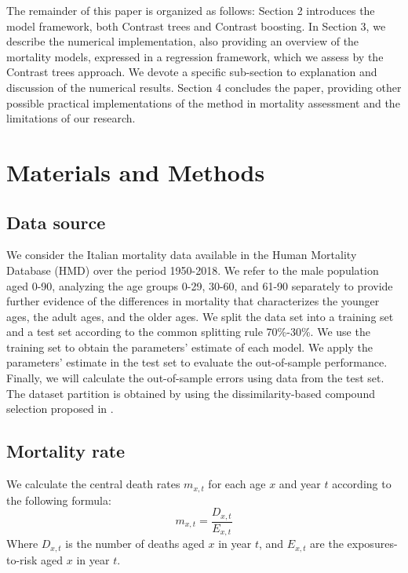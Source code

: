 \documentclass[a4,11pt]{article}
\begin{document}
The remainder of this paper is organized as follows: Section 2 introduces the model framework, both Contrast trees and Contrast boosting. 
In Section 3, we describe the numerical implementation, also providing an overview of the mortality models, expressed in a regression framework, which we assess by the Contrast trees approach. We devote a specific sub-section to explanation and discussion of the numerical results. 
Section 4 concludes the paper, providing other possible practical implementations of the method in mortality assessment and the limitations of our research.

\section{Materials and Methods}

\subsection{Data source}

We consider the Italian mortality data available in the Human Mortality Database (HMD) over the period 1950-2018. We refer to the male population aged 0-90, analyzing the age groups 0-29, 30-60, and 61-90 separately to provide further evidence of the differences in mortality that characterizes the younger ages, the adult ages, and the older ages. 
We split the data set into a training set and a test set according to the common splitting rule 70\%-30\%. 
We use the training set to obtain the parameters' estimate of each model. We apply the parameters' estimate in the test set to evaluate the out-of-sample performance. Finally, we will calculate the out-of-sample errors using data from the test set. The dataset partition is obtained by using the dissimilarity-based compound selection proposed in \cite{Willett1999}.

\subsection*{Mortality rate}
We calculate the central death rates $m_{x,t}$ for each age $x$ and year $t$ according to the following formula:
\begin{equation} 
\label{eq:mxt}
m_{x,t}=\frac{D_{x,t}}{E_{x,t}}
\end{equation}
Where $D_{x,t}$ is the number of deaths aged $x$ in year $t$, and $E_{x,t}$ are the exposures-to-risk aged $x$ in year $t$.
\end{document}
